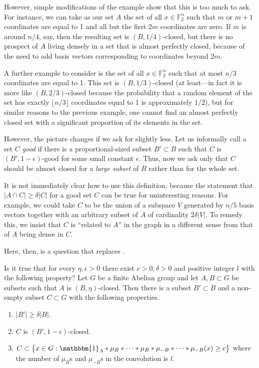 \documentclass{toc}
\newcommand\eps{\epsilon}  %
\newcommand\F{\mathbb{F}}
\renewcommand\d{\delta}
\newcommand{\ind}{\mathbbm{1}}
\renewcommand\AA{\ind_A}
\begin{document}
However, simple modifications of the example show that this is too much to ask. For instance, we can take as our set $A$ the set of all $x\in\F_2^n$ such that $m$ or $m+1$ coordinates are equal to 1 and all but the first $2m$ coordinates are zero. If $m$ is around $n/4$, say, then the resulting set is  $(B,1/4)$-closed, but there is no prospect of $A$ living densely in a set that is almost perfectly closed, because of the need to add basis vectors corresponding to coordinates beyond $2m$. 

A further example to consider is the set of all $x\in\F_2^n$ such that at most $n/3$ coordinates are equal to 1. This set is  $(B,1/3)$-closed (at least---in fact it is more like $(B,2/3)$-closed because the probability that a random element of the set has exactly $\lfloor n/3\rfloor$ coordinates equal to 1 is approximately $1/2$), but for similar reasons to the previous example, one cannot find an almost perfectly closed set with a significant proportion of its elements in the set.

However, the picture changes if we ask for slightly less. Let us informally call a set $C$ \emph{good} if there is a proportional-sized subset $B'\subset B$ such that $C$ is $(B',1-\eps)$-good for some small constant $\eps$. Thus, now we ask only that $C$ should be almost closed for a \emph{large subset} of $B$ rather than for the whole set. 

It is not immediately clear how to use this definition, because the statement that $|A\cap C|\geq\d|C|$ for a good set $C$ can be true for uninteresting reasons. For example, we could take $C$ to be the union of a subspace $V$ generated by $n/5$ basis vectors together with an arbitrary subset of $A$ of cardinality $2\d|V|$. To remedy this, we insist that $C$ is ``related to $A$'' in the graph in a different sense from that of $A$ being dense in $C$.

Here, then, is a question that replaces .

\begin{question} \label{mainq}
	Is it true that for every $\eta,\eps>0$ there exist $c>0,\d>0$ and positive integer $l$ with the following property? Let $G$ be a finite Abelian group and let $A,B\subset G$ be subsets such that $A$ is $(B,\eta)$-closed. Then there is a subset $B'\subset B$ and a non-empty subset $C\subset G$ with the following properties.
	\begin{enumerate}
		\item $|B'|\geq\d|B|$.
		\item $C$ is  $(B',1-\eps)$-closed.
		\item $C\subset \bigl\{x\in G: \AA*\mu_B*\dots*\mu_B*\mu_{-B}*\dots*\mu_{-B}(x)\geq c\bigr\}$ where the number of $\mu_B$s and $\mu_{-B}$s in the convolution is $l$.
	\end{enumerate}
\end{question}
\end{document}
